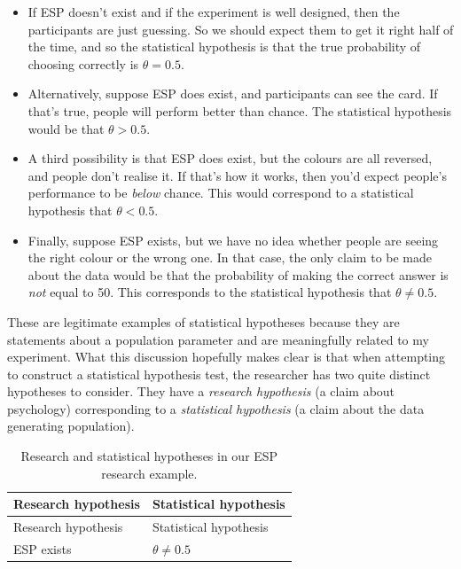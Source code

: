 \documentclass[
  11pt,
  a4paper,
  twoside,symmetric,openright]{book}
\providecommand{\tightlist}{%
  \setlength{\itemsep}{0pt}\setlength{\parskip}{0pt}}
\theoremstyle{break}
\theoremstyle{break}
\begin{document}
\begin{itemize}
\tightlist
\item
  If ESP doesn't exist and if the experiment is well designed, then the participants are just guessing. So we should expect them to get it right half of the time, and so the statistical hypothesis is that the true probability of choosing correctly is \(\theta = 0.5\).
\item
  Alternatively, suppose ESP does exist, and participants can see the card. If that's true, people will perform better than chance. The statistical hypothesis would be that \(\theta > 0.5\).
\item
  A third possibility is that ESP does exist, but the colours are all reversed, and people don't realise it. If that's how it works, then you'd expect people's performance to be \emph{below} chance. This would correspond to a statistical hypothesis that \(\theta < 0.5\).
\item
  Finally, suppose ESP exists, but we have no idea whether people are seeing the right colour or the wrong one. In that case, the only claim to be made about the data would be that the probability of making the correct answer is \emph{not} equal to 50. This corresponds to the statistical hypothesis that \(\theta \neq 0.5\).
\end{itemize}

These are legitimate examples of statistical hypotheses because they are statements about a population parameter and are meaningfully related to my experiment. What this discussion hopefully makes clear is that when attempting to construct a statistical hypothesis test, the researcher has two quite distinct hypotheses to consider. They have a \emph{research hypothesis} (a claim about psychology) corresponding to a \emph{statistical hypothesis} (a claim about the data generating population).

\begin{longtable}[]{@{}ll@{}}
\caption{\label{tab:unnamed-chunk-32}Research and statistical hypotheses in our ESP research example.}\tabularnewline
\toprule\noalign{}
Research hypothesis & Statistical hypothesis \\
\midrule\noalign{}
\endfirsthead
\toprule\noalign{}
Research hypothesis & Statistical hypothesis \\
\midrule\noalign{}
\endhead
\bottomrule\noalign{}
\endlastfoot
ESP exists & \(\theta \neq 0.5\) \\
\end{longtable}
\end{document}
